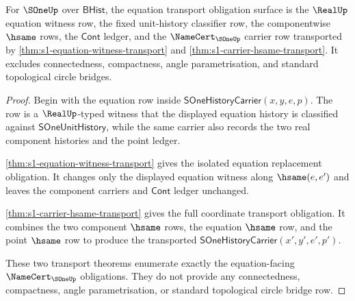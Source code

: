 \begin{theorem}
\label{thm:s1-equation-transport-obligation-surface}
For $\SOneUp$ over $\mathsf{BHist}$, the equation transport obligation surface
is the $\RealUp$ equation witness row, the fixed unit-history classifier row,
the componentwise $\hsame$ rows, the $\mathsf{Cont}$ ledger, and the
$\NameCert_{\SOneUp}$ carrier row transported by
\autoref{thm:s1-equation-witness-transport} and
\autoref{thm:s1-carrier-hsame-transport}. It excludes connectedness,
compactness, angle parametrisation, and standard topological circle bridges.
\end{theorem}
\begin{proof}
Begin with the equation row inside
$\mathsf{SOneHistoryCarrier}(x,y,e,p)$. The row is a
$\RealUp$-typed witness that the displayed equation history is classified
against $\mathsf{SOneUnitHistory}$, while the same carrier also records the
two real component histories and the point ledger.

\autoref{thm:s1-equation-witness-transport} gives the isolated equation
replacement obligation. It changes only the displayed equation witness along
$\hsame(e,e')$ and leaves the component carriers and $\mathsf{Cont}$ ledger
unchanged.

\autoref{thm:s1-carrier-hsame-transport} gives the full coordinate transport
obligation. It combines the two component $\hsame$ rows, the equation
$\hsame$ row, and the point $\hsame$ row to produce the transported
$\mathsf{SOneHistoryCarrier}(x',y',e',p')$.

These two transport theorems enumerate exactly the equation-facing
$\NameCert_{\SOneUp}$ obligations. They do not provide any connectedness,
compactness, angle parametrisation, or standard topological circle bridge row.
\end{proof}

